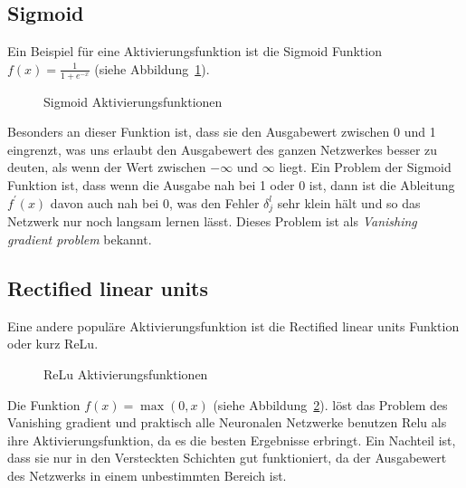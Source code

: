 \documentclass[12pt,a4paper]{report}
\begin{document}
\subsection{Sigmoid}
Ein Beispiel für eine Aktivierungsfunktion ist die Sigmoid Funktion $f(x) = \frac{1}{1 + e^{-x}}$ (siehe Abbildung~\ref{fig:activation1}).
\begin{figure}[h]
    \centering
{}
    \caption{Sigmoid Aktivierungsfunktionen}
    \label{fig:activation1}
\end{figure}
Besonders an dieser Funktion ist, dass sie den Ausgabewert zwischen 0 und 1 eingrenzt, was uns erlaubt den Ausgabewert des ganzen
Netzwerkes besser zu deuten, als wenn der Wert zwischen $-\infty$ und $\infty$ liegt.
Ein Problem der Sigmoid Funktion ist, dass wenn die Ausgabe nah bei 1 oder 0 ist, dann ist die Ableitung $f^\prime(x)$ davon auch nah bei 0,
was den Fehler $\delta^l_j$ sehr klein hält und so das Netzwerk nur noch langsam lernen lässt.
Dieses Problem ist als \textit{Vanishing gradient problem} bekannt.
\subsection{Rectified linear units}
Eine andere populäre Aktivierungsfunktion ist die Rectified linear units Funktion oder kurz ReLu.
\begin{figure}[h]
    \centering
{}
    \caption{ReLu Aktivierungsfunktionen}
    \label{fig:activation2}
\end{figure}
Die Funktion $f(x) = \max(0, x)$ (siehe Abbildung~\ref{fig:activation2}).
löst das Problem des Vanishing gradient und praktisch alle Neuronalen Netzwerke benutzen Relu als ihre Aktivierungsfunktion,
da es die besten Ergebnisse erbringt.
Ein Nachteil ist, dass sie nur in den Versteckten Schichten gut funktioniert,
da der Ausgabewert des Netzwerks in einem unbestimmten Bereich ist.
\end{document}
